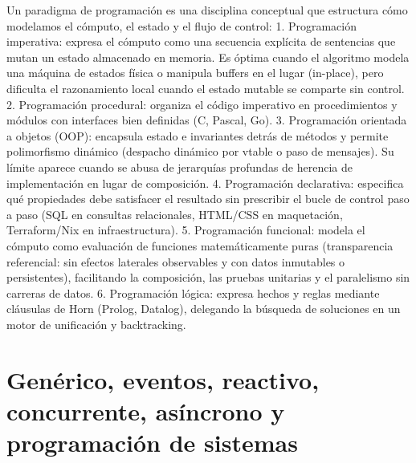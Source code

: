 \documentclass{book}
\begin{document}
Un paradigma de programación es una disciplina conceptual que estructura cómo modelamos el cómputo, el estado y el flujo de control:
1. Programación imperativa: expresa el cómputo como una secuencia explícita de sentencias que mutan un estado almacenado en memoria. Es óptima cuando el algoritmo modela una máquina de estados física o manipula buffers en el lugar (in-place), pero dificulta el razonamiento local cuando el estado mutable se comparte sin control.
2. Programación procedural: organiza el código imperativo en procedimientos y módulos con interfaces bien definidas (C, Pascal, Go).
3. Programación orientada a objetos (OOP): encapsula estado e invariantes detrás de métodos y permite polimorfismo dinámico (despacho dinámico por vtable o paso de mensajes). Su límite aparece cuando se abusa de jerarquías profundas de herencia de implementación en lugar de composición.
4. Programación declarativa: especifica qué propiedades debe satisfacer el resultado sin prescribir el bucle de control paso a paso (SQL en consultas relacionales, HTML/CSS en maquetación, Terraform/Nix en infraestructura).
5. Programación funcional: modela el cómputo como evaluación de funciones matemáticamente puras (transparencia referencial: sin efectos laterales observables y con datos inmutables o persistentes), facilitando la composición, las pruebas unitarias y el paralelismo sin carreras de datos.
6. Programación lógica: expresa hechos y reglas mediante cláusulas de Horn (Prolog, Datalog), delegando la búsqueda de soluciones en un motor de unificación y backtracking.

\section{Genérico, eventos, reactivo, concurrente, asíncrono y programación de sistemas}
\end{document}
